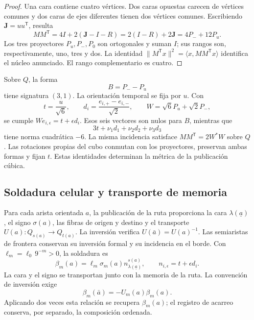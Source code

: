 \begin{proof}
Una cara contiene cuatro vértices. Dos caras opuestas carecen de vértices
comunes y dos caras de ejes diferentes tienen dos vértices comunes.
Escribiendo \(\mathbf J=uu^{\mathsf T}\), resulta
\[
 MM^{\mathsf T}=4I+2(\mathbf J-I-R)
 =2(I-R)+2\mathbf J=4P_-+12P_u.
\]
Los tres proyectores \(P_u,P_-,P_0\) son ortogonales y suman \(I\);
sus rangos son, respectivamente, uno, tres y dos. La identidad
\(\|M^{\mathsf T}x\|^2=\langle x,MM^{\mathsf T}x\rangle\)
identifica el núcleo anunciado. El rango complementario es cuatro.
\end{proof}

Sobre \(Q\), la forma
\[
 B=P_--P_u
\]
tiene signatura \((3,1)\). La orientación temporal se fija por \(u\).
Con
\[
 t=\frac{u}{\sqrt6},\qquad
 d_i=\frac{e_{i,+}-e_{i,-}}{\sqrt2},\qquad
 W=\sqrt6P_u+\sqrt2P_-,
\]
se cumple \(We_{i,\epsilon}=t+\epsilon d_i\). Esos seis vectores
son nulos para \(B\), mientras que
\[
 3t+\nu_1d_1+\nu_2d_2+\nu_3d_3
\]
tiene norma cuadrática \(-6\). La misma incidencia satisface
\(MM^{\mathsf T}=2W^*W\) sobre \(Q\). Las rotaciones propias del cubo
conmutan con los proyectores, preservan ambas formas y fijan \(t\).
Estas identidades determinan la métrica de la publicación cúbica.

\subsection{Soldadura celular y transporte de memoria}
\label{vii:sec:soldadura-celular}

Para cada arista orientada \(a\), la publicación de la ruta proporciona
la cara \(\lambda(\underline a)\), el signo
\(\sigma(a)\), las fibras de origen y destino y el transporte
\(U(a):Q_{s(a)}\longrightarrow Q_{t(a)}\).
La inversión verifica \(U(\bar a)=U(a)^{-1}\).
Las semiaristas de frontera conservan su inversión formal y su incidencia
en el borde. Con \(\ell_m=\ell_0\,9^{-m}>0\), la soldadura es
\begin{equation}
 \beta_m(a)=\ell_m\sigma_m(a)
              n_{\lambda(\underline a)}^{s(a)},\qquad
 n_{i,\epsilon}=t+\epsilon d_i.
 \label{vii:eq:soldadura-arista}
\end{equation}
La cara y el signo se transportan junto con la memoria de la ruta.
La convención de inversión exige
\begin{equation}
 \beta_m(\bar a)=-U_m(a)\beta_m(a).
 \label{vii:eq:inversion-soldadura}
\end{equation}
Aplicando dos veces esta relación se recupera \(\beta_m(a)\);
el registro de acarreo conserva, por separado, la composición ordenada.

